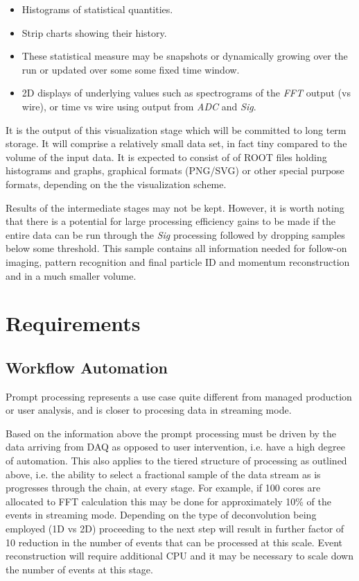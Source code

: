 \documentclass[pdftex,12pt,letter]{article}
\begin{document}
\begin{itemize}
\item Histograms of statistical quantities.
\item Strip charts showing their history.
\item These statistical measure may be snapshots or dynamically
  growing over the run or updated over some some fixed time window.
\item 2D displays of underlying values such as spectrograms of the \textit{FFT}
  output (vs wire), or time vs wire using output from \textit{ADC} and \textit{Sig}.
\end{itemize}


\noindent It is the output of this visualization stage which will be
committed to long term storage.  It will comprise a relatively small
data set, in fact tiny compared to the volume of the input data.  It is expected
to consist of of ROOT files holding histograms and graphs, graphical formats (PNG/SVG)
or other special purpose formats, depending on the the visualization scheme.

Results of the intermediate stages may not be kept.  However, it is
worth noting that there is a potential for large processing efficiency
gains to be made if the entire data can be run through the
\textit{Sig} processing followed by dropping samples below some
threshold.  This sample contains all information needed for follow-on
imaging, pattern recognition and final particle ID and momentum
reconstruction and in a much smaller volume.

\section{Requirements}

\subsection{Workflow Automation}

Prompt processing represents a use case quite different from managed production or user analysis, and is closer to
procesing data in streaming mode.

Based on the information above the prompt processing must be driven by the data arriving from DAQ as opposed
to user intervention, i.e. have a high degree of automation. This also applies to the tiered structure of processing as outlined above,
i.e. the ability to select a fractional sample of the data stream as is progresses through the chain, at every stage.
For example, if 100 cores are allocated to FFT calculation this may be done for approximately 10\% of the events
in streaming mode. Depending on the type of deconvolution being employed (1D vs 2D) proceeding to the next
step will result in further factor of 10 reduction in the number of events that can be processed at this scale.
Event reconstruction will require additional CPU and it may be necessary to scale down the number of
events at this stage.
\end{document}
